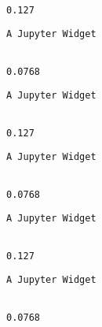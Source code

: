 \documentclass[11pt]{article}
\begin{document}
    
    \begin{Verbatim}[commandchars=\\\{\}]

0.127

    \end{Verbatim}

    
    \begin{verbatim}
A Jupyter Widget
    \end{verbatim}

    
    \begin{Verbatim}[commandchars=\\\{\}]

0.0768

    \end{Verbatim}

    
    \begin{verbatim}
A Jupyter Widget
    \end{verbatim}

    
    \begin{Verbatim}[commandchars=\\\{\}]

0.127

    \end{Verbatim}

    
    \begin{verbatim}
A Jupyter Widget
    \end{verbatim}

    
    \begin{Verbatim}[commandchars=\\\{\}]

0.0768

    \end{Verbatim}

    
    \begin{verbatim}
A Jupyter Widget
    \end{verbatim}

    
    \begin{Verbatim}[commandchars=\\\{\}]

0.127

    \end{Verbatim}

    
    \begin{verbatim}
A Jupyter Widget
    \end{verbatim}

    
    \begin{Verbatim}[commandchars=\\\{\}]

0.0768

    \end{Verbatim}
\end{document}
